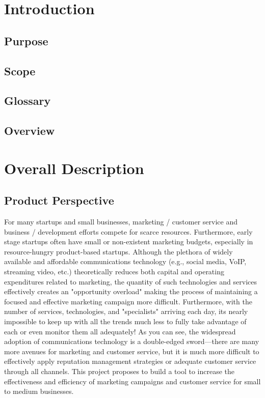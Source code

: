 \documentclass{article}
\begin{document}
\section{Introduction}

\subsection{Purpose}
\subsection{Scope}
\subsection{Glossary}
\subsection{Overview}

\section{Overall Description}
	\subsection{Product Perspective}
		For many startups and small businesses, marketing / customer service
		and business / development efforts compete for scarce resources.
		Furthermore, early stage startups often have small or non-existent
		marketing budgets, especially in resource-hungry product-based
		startups.  Although the plethora of widely available and affordable
		communications technology (e.g., social media, VoIP, streaming video,
			etc.) theoretically reduces both capital and operating
		expenditures related to marketing, the quantity of such technologies
		and services effectively creates an "opportunity overload" making the
		process of maintaining a focused and effective marketing campaign more
		difficult.  Furthermore, with the number of services, technologies,
		and "specialists" arriving each day, its nearly impossible to keep up
		with all the trends much less to fully take advantage of each or even
		monitor them all adequately! As you can see, the widespread adoption of communications technology is a double-edged sword---there are many more avenues for marketing and customer service, but it is much more difficult to effectively apply reputation management strategies or adequate customer service through all channels. This project proposes to build a tool to increase the effectiveness and efficiency of marketing campaigns and customer service for small to medium businesses.  
\end{document}
